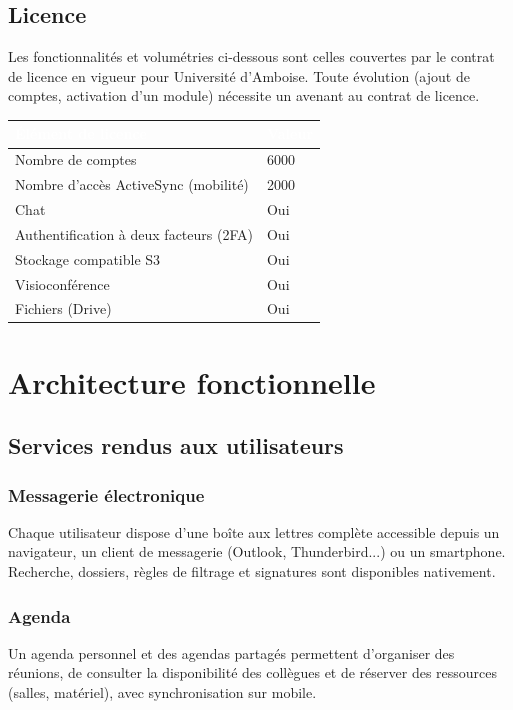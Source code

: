 \documentclass[11pt,a4paper]{report}
\newcommand{\tblhead}[1]{\textcolor{white}{\textbf{#1}}}
\begin{document}
\section{Licence}
Les fonctionnalités et volumétries ci-dessous sont celles couvertes par le contrat de licence en vigueur pour Université d'Amboise. Toute évolution (ajout de comptes, activation d'un module) nécessite un avenant au contrat de licence.
\begin{longtable}{|p{7cm}|p{6cm}|}
\hline
\rowcolor{primary}\tblhead{Élément de licence} & \tblhead{Valeur} \\
\hline
\endhead
Nombre de comptes & 6000 \\
\hline
Nombre d'accès ActiveSync (mobilité) & 2000 \\
\hline
Chat & Oui \\
\hline
Authentification à deux facteurs (2FA) & Oui \\
\hline
Stockage compatible S3 & Oui \\
\hline
Visioconférence & Oui \\
\hline
Fichiers (Drive) & Oui \\
\hline
\end{longtable}

\chapter{Architecture fonctionnelle}

\section{Services rendus aux utilisateurs}
\subsection{Messagerie électronique}
Chaque utilisateur dispose d'une boîte aux lettres complète accessible depuis un navigateur, un client de messagerie (Outlook, Thunderbird.\allowbreak{}.\allowbreak{}.\allowbreak{}) ou un smartphone.\allowbreak{} Recherche, dossiers, règles de filtrage et signatures sont disponibles nativement.\allowbreak{}

\subsection{Agenda}
Un agenda personnel et des agendas partagés permettent d'organiser des réunions, de consulter la disponibilité des collègues et de réserver des ressources (salles, matériel), avec synchronisation sur mobile.\allowbreak{}
\end{document}
